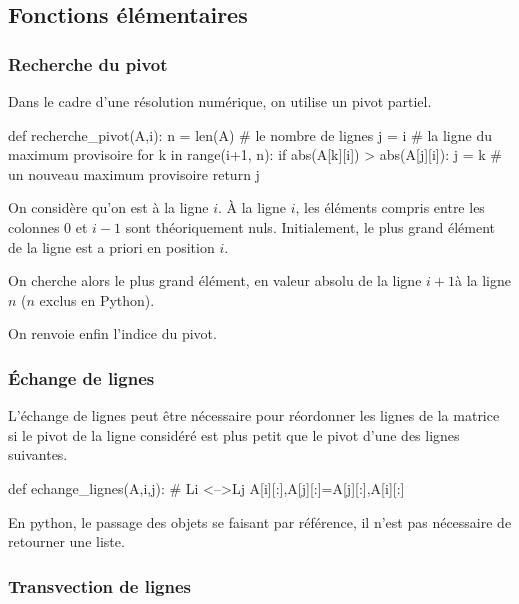 \documentclass[10pt]{article}
\begin{document}
\subsection{Fonctions élémentaires}
\subsubsection{Recherche du pivot}
Dans le cadre d'une résolution numérique, on utilise un pivot partiel. 

\begin{py}
\begin{python}
def recherche_pivot(A,i):
    n = len(A) # le nombre de lignes
    j = i # la ligne du maximum provisoire
    for k in range(i+1, n):
        if abs(A[k][i]) > abs(A[j][i]):
            j = k # un nouveau maximum provisoire
    return j
\end{python}
\end{py}

On considère qu'on est à la ligne $i$. \`A la ligne $i$, les éléments compris entre les colonnes 0 et $i-1$ sont théoriquement nuls. Initialement, le plus grand élément de la ligne est a priori en position $i$. 

On cherche alors le plus grand élément, en valeur absolu de la ligne $i+1$à la ligne $n$ ($n$ exclus en Python). 

On renvoie enfin l'indice du pivot. 

\subsubsection{Échange de lignes}

L'échange de lignes peut être nécessaire pour réordonner les lignes de la matrice si le pivot de la ligne considéré est plus petit que le pivot d'une des lignes suivantes.  

\begin{py}
\begin{python}
def echange_lignes(A,i,j):
    # Li <-->Lj
    A[i][:],A[j][:]=A[j][:],A[i][:]
\end{python}
\end{py}

\begin{rem}
En python, le passage des objets se faisant par référence, il n'est pas nécessaire de retourner une liste. 
\end{rem}

\subsubsection{Transvection de lignes}
\end{document}
